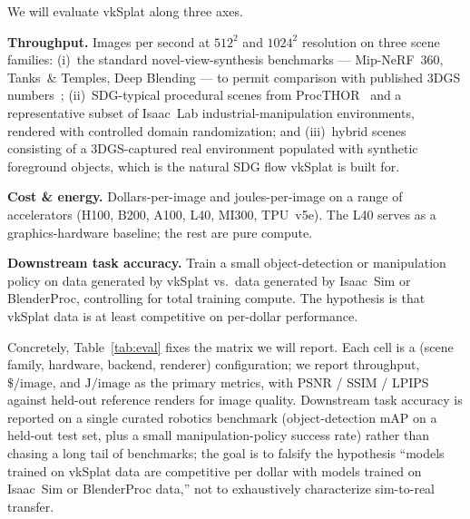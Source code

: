 \documentclass[10pt,journal]{IEEEtran}
\begin{document}
We will evaluate vkSplat along three axes.

\textbf{Throughput.} Images per second at $512^2$ and $1024^2$
resolution on three scene families:
(i)~the standard novel-view-synthesis benchmarks --- Mip-NeRF~360,
Tanks~\& Temples, Deep Blending --- to permit comparison with
published 3DGS numbers~\cite{kerbl20233dgs};
(ii)~SDG-typical procedural scenes from ProcTHOR~\cite{deitke2022procthor}
and a representative subset of Isaac~Lab industrial-manipulation
environments, rendered with controlled domain randomization;
and (iii)~hybrid scenes consisting of a 3DGS-captured real environment
populated with synthetic foreground objects, which is the natural SDG
flow vkSplat is built for.

\textbf{Cost \& energy.} Dollars-per-image and joules-per-image on a
range of accelerators (H100, B200, A100, L40, MI300, TPU~v5e). The L40
serves as a graphics-hardware baseline; the rest are pure compute.

\textbf{Downstream task accuracy.} Train a small object-detection or
manipulation policy on data generated by vkSplat vs.\ data generated by
Isaac~Sim or BlenderProc, controlling for total training compute. The
hypothesis is that vkSplat data is at least competitive on per-dollar
performance.

Concretely, Table~\ref{tab:eval} fixes the matrix we will report.
Each cell is a (scene family, hardware, backend, renderer)
configuration; we report throughput, $\$\slash\textrm{image}$, and
$\textrm{J}\slash\textrm{image}$ as the primary metrics, with PSNR /
SSIM / LPIPS against held-out reference renders for image quality.
Downstream task accuracy is reported on a single curated robotics
benchmark (object-detection mAP on a held-out test set, plus a small
manipulation-policy success rate) rather than chasing a long tail of
benchmarks; the goal is to falsify the hypothesis ``models trained on
vkSplat data are competitive per dollar with models trained on
Isaac~Sim or BlenderProc data,'' not to exhaustively characterize
sim-to-real transfer.
\end{document}

